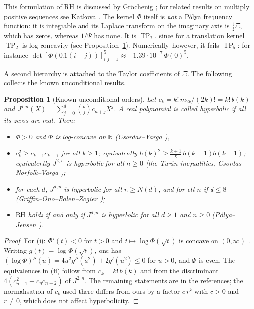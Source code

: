 \documentclass[11pt]{amsart}
\newtheorem{proposition}[theorem]{Proposition}
\theoremstyle{definition}
\theoremstyle{remark}
\DeclareMathOperator{\TP}{TP}
\newcommand{\bbR}{\mathbb{R}}
\newcommand{\Xib}{\Xi}
\newcommand{\RH}{\mathrm{RH}}
\begin{document}
This formulation of RH is discussed by Gr\"ochenig \cite{Groechenig20}; for
related results on multiply positive sequences see Katkova \cite{Katkova07}.
The kernel $\Phi$ itself is \emph{not} a P\'olya frequency function: it is
integrable and its Laplace transform on the imaginary axis is
$\tfrac12\Xib$, which has zeros, whereas $1/\Psi$ has none. It is $\TP_2$,
since for a translation kernel $\TP_2$ is log-concavity (see
Proposition~\ref{prop:orders}). Numerically, however, it fails $\TP_5$:
for instance $\det[\Phi(0.1(i-j))]_{i,j=1}^{5}\approx-1.39\cdot10^{-7}\,\Phi(0)^5$.

A second hierarchy is attached to the Taylor coefficients of $\Xib$. The
following collects the known unconditional results.

\begin{proposition}[Known unconditional orders]\label{prop:orders}
Let $c_k=k!\,m_{2k}/(2k)!=k!\,b(k)$ and
$J^{d,n}(X)=\sum_{j=0}^{d}\binom dj c_{n+j}X^j$. A real polynomial is called
hyperbolic if all its zeros are real. Then:
\begin{itemize}
\item[\rm(i)] $\Phi>0$ and $\Phi$ is log-concave on $\bbR$
{\rm(Csordas--Varga \cite{CV90})};
\item[\rm(ii)] $c_k^2\ge c_{k-1}c_{k+1}$ for all $k\ge1$;
equivalently $b(k)^2\ge\frac{k+1}{k}\,b(k-1)b(k+1)$; equivalently $J^{2,n}$ is
hyperbolic for all $n\ge0$ {\rm(the Tur\'an inequalities,
Csordas--Norfolk--Varga \cite{CNV86})};
\item[\rm(iii)] for each $d$, $J^{d,n}$ is hyperbolic for all $n\ge N(d)$, and
for all $n$ if $d\le 8$ {\rm(Griffin--Ono--Rolen--Zagier \cite{GORZ19})};
\item[\rm(iv)] $\RH$ holds if and only if $J^{d,n}$ is hyperbolic for all
$d\ge1$ and $n\ge0$ {\rm(P\'olya--Jensen \cite{Polya27})}.
\end{itemize}
\end{proposition}
\begin{proof}
For (i): $\Phi'(t)<0$ for $t>0$ \cite{CNV86} and $t\mapsto\log\Phi(\sqrt t)$ is
concave on $(0,\infty)$ \cite{CV90}. Writing $g(t)=\log\Phi(\sqrt t)$, one has
$(\log\Phi)''(u)=4u^2g''(u^2)+2g'(u^2)\le0$ for $u>0$, and $\Phi$ is even. The
equivalences in (ii) follow from $c_k=k!\,b(k)$ and from the discriminant
$4(c_{n+1}^2-c_nc_{n+2})$ of $J^{2,n}$. The remaining
statements are in the references; the normalisation of $c_k$ used there
differs from ours by a factor $c\,r^k$ with $c>0$ and $r\ne0$, which does not
affect hyperbolicity.
\end{proof}
\end{document}
